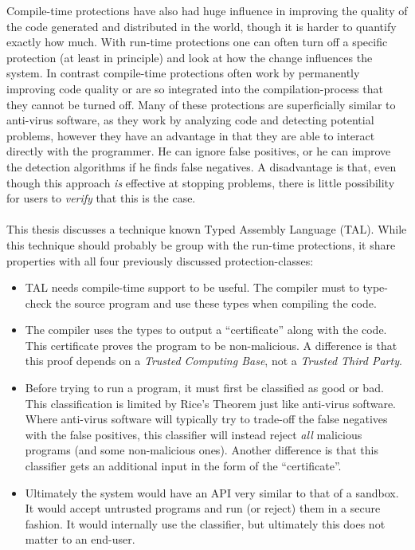 Compile-time protections have also had huge influence in improving the quality
of the code generated and distributed in the world, though it is harder to
quantify exactly how much. With run-time protections one can often turn off a
specific protection (at least in principle) and look at how the change
influences the system. In contrast compile-time protections often work by
permanently improving code quality or are so integrated into the
compilation-process that they cannot be turned off. Many of these protections
are superficially similar to anti-virus software, as they work by analyzing code
and detecting potential problems, however they have an advantage in that they
are able to interact directly with the programmer. He can ignore false
positives, or he can improve the detection algorithms if he finds false
negatives. A disadvantage is that, even though this approach \emph{is} effective
at stopping problems, there is little possibility for users to \emph{verify}
that this is the case.

\paragraph{}
This thesis discusses a technique known Typed Assembly Language (TAL). While
this technique should probably be group with the run-time protections, it share
properties with all four previously discussed protection-classes:

\begin{itemize}
\item TAL needs compile-time support to be useful. The compiler must to
  type-check the source program and use these types when compiling the code.

\item The compiler uses the types to output a ``certificate'' along with the
  code. This certificate proves the program to be non-malicious. A difference is
  that this proof depends on a \emph{Trusted Computing Base}, not a
  \emph{Trusted Third Party}.

\item Before trying to run a program, it must first be classified as good or
  bad. This classification is limited by Rice's Theorem just like anti-virus
  software. Where anti-virus software will typically try to trade-off the false
  negatives with the false positives, this classifier will instead reject
  \emph{all} malicious programs (and some non-malicious ones). Another
  difference is that this classifier gets an additional input in the form of the
  ``certificate''.

\item Ultimately the system would have an API very similar to that of a
  sandbox. It would accept untrusted programs and run (or reject) them in a
  secure fashion. It would internally use the classifier, but ultimately this
  does not matter to an end-user.
\end{itemize}

